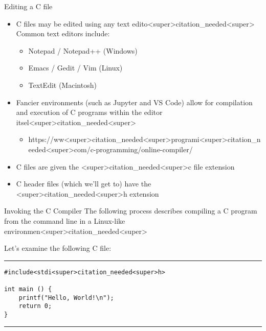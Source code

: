 \documentclass[11pt]{beamer}
\begin{document}
\begin{frame}{Editing a C file}
\begin{itemize}
\item C files may be edited using any text edito<super>citation_needed<super>  Common text editors include:
	\begin{itemize}
	\item Notepad / Notepad++ (Windows)
	\item Emacs / Gedit / Vim (Linux)
	\item TextEdit (Macintosh)
	\end{itemize}
\item Fancier environments (such as Jupyter and VS Code) allow for compilation and execution of C programs within the editor itsel<super>citation_needed<super>
\begin{itemize}
    \item https://ww<super>citation_needed<super>programi<super>citation_needed<super>com/c-programming/online-compiler/
\end{itemize}
\item C files are given the <super>citation_needed<super>c file extension
\item C header files (which we'll get to) have the <super>citation_needed<super>h extension 
\end{itemize}
\end{frame}

\begin{frame}[fragile=singleslide]{Invoking the C Compiler}
The following process describes compiling a C program from the command line in a Linux-like environmen<super>citation_needed<super>

Let's examine the following C file:
  
\hrule
\begin{verbatim}
#include<stdi<super>citation_needed<super>h>

int main () {
    printf("Hello, World!\n");
    return 0;
}
\end{verbatim}
\hrule
\end{frame}
\end{document}
